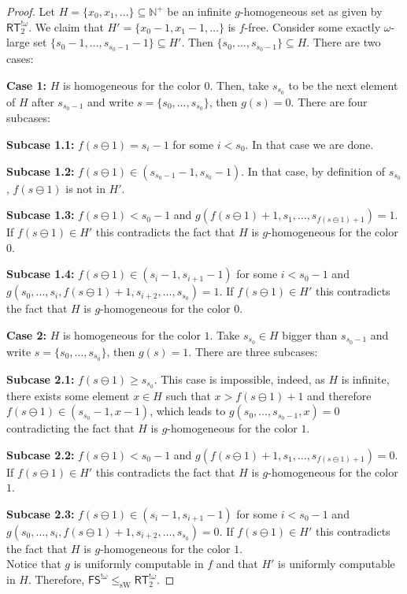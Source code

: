 \documentclass[10pt,a4paper]{article}
\newcommand{\FS}[0]{\mathsf{FS}}
\newcommand{\RT}[0]{\mathsf{RT}}
\newcommand{\NN}[0]{\mathbb{N}}
\newcommand{\sW}{\mathrm{sW}}
\numberwithin{theorem}{section}
\begin{document}
\begin{proof}
Let $H = \{x_0, x_1, \dots \}\subseteq \NN^+$ %
be an infinite $g$-homogeneous set as given by $\RT^{!\omega}_2$. We claim that $H' = \{x_0 - 1, x_1 - 1, \dots \}$ is $f$-free. Consider some exactly $\omega$-large set $\{s_0 - 1, \dots, s_{s_0 - 1} - 1\} \subseteq H'$. Then $\{s_0, \dots, s_{s_0 - 1}\} \subseteq H$. There are two cases:

\textbf{Case 1:} $H$ is homogeneous for the color $0$. Then, take $s_{s_0}$ to be the next element of $H$ after $s_{s_0 - 1}$ and write $s = \{s_0, \dots, s_{s_0}\}$, then $g(s) = 0$. There are four subcases:

\textbf{Subcase 1.1:} $f(s \ominus 1) = s_i - 1$ for some $i < s_0$. In that case we are done.

\textbf{Subcase 1.2:} $f(s \ominus 1) \in (s_{s_0 - 1} - 1, s_{s_0} - 1)$. In that case, by definition of $s_{s_0}$, $f(s \ominus 1)$ is not in $H'$.

\textbf{Subcase 1.3:} $f(s \ominus 1) < s_0 - 1$ and $g(f(s \ominus 1) + 1, s_1, \dots, s_{f(s \ominus 1) + 1}) = 1$. If $f(s \ominus 1) \in H'$ this contradicts the fact that $H$ is $g$-homogeneous for the color $0$. 

\textbf{Subcase 1.4:} $f(s \ominus 1) \in (s_i - 1, s_{i+1} - 1)$ for some $i < s_0 - 1$ and $g(s_0, \dots, s_i, f(s \ominus 1) + 1 ,s_{i+2}, \dots, s_{s_0}) = 1$. If $f(s \ominus 1) \in H'$ this contradicts the fact that $H$ is $g$-homogeneous for the color $0$. 

\textbf{Case 2:} $H$ is homogeneous for the color $1$. Take $s_{s_0} \in H$ bigger than $s_{s_0 - 1}$ and write $s = \{s_0, \dots, s_{s_0}\}$, then $g(s) = 1$. There are three subcases:

\textbf{Subcase 2.1:} $f(s \ominus 1) \geq s_{s_0}$. This case is impossible, indeed, as $H$ is infinite, there exists some element $x \in H$ such that $x > f(s \ominus 1) + 1$ and therefore $f(s \ominus 1) \in (s_{s_0} - 1, x - 1)$, which leads to $g(s_0, \dots, s_{s_0 - 1}, x) = 0$ contradicting the fact that $H$ is $g$-homogeneous for the color $1$.

\textbf{Subcase 2.2:} $f(s \ominus 1) < s_0 - 1$ and $g(f(s \ominus 1) + 1, s_1, \dots, s_{f(s \ominus 1) + 1}) = 0$. If $f(s \ominus 1) \in H'$ this contradicts the fact that $H$ is $g$-homogeneous for the color $1$. 

\textbf{Subcase 2.3:}  $f(s \ominus 1) \in (s_i - 1, s_{i+1} - 1)$ for some $i < s_0 - 1$ and $g(s_0, \dots, s_i, f(s \ominus 1) + 1 ,s_{i+2}, \dots, s_{s_0}) = 0$. If $f(s \ominus 1) \in H'$ this contradicts the fact that $H$ is $g$-homogeneous for the color $1$.  \\

Notice that $g$ is uniformly computable in $f$ and that $H'$ is uniformly computable in $H$. Therefore, $\FS^{!\omega} \leq_{\sW} \RT^{!\omega}_2$.

\end{proof}



\end{document}
